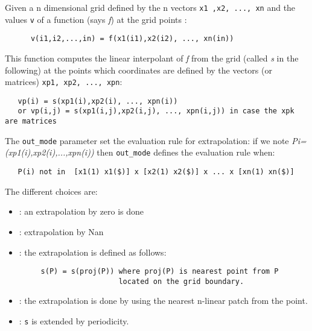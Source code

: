 \begin{mandescription}
  Given a n dimensional grid defined by the n vectors \verb!x1 ,x2, ..., xn! and the
  values \verb!v! of a function (says {\em f}) at the grid points :
\begin{verbatim}
      v(i1,i2,...,in) = f(x1(i1),x2(i2), ..., xn(in))
\end{verbatim}
  This function computes the linear interpolant of {\em f} from the grid (called {\em s}
  in the following) at the points which coordinates are defined by the vectors (or matrices) 
  \verb!xp1, xp2, ..., xpn!:
\begin{verbatim}
   vp(i) = s(xp1(i),xp2(i), ..., xpn(i))
   or vp(i,j) = s(xp1(i,j),xp2(i,j), ..., xpn(i,j)) in case the xpk are matrices
\end{verbatim}
    The \verb!out_mode! parameter set the evaluation rule for extrapolation: if we note 
    {\em Pi=(xp1(i),xp2(i),...,xpn(i))} then \verb!out_mode! defines the
    evaluation rule when:
\begin{verbatim}
   P(i) not in  [x1(1) x1($)] x [x2(1) x2($)] x ... x [xn(1) xn($)]
\end{verbatim}
    The different choices are:
  \begin{itemize}
  \item {} : an extrapolation by zero is done
  \item {} : extrapolation by Nan
  \item {} : the extrapolation is defined as follows:
\begin{verbatim}
     s(P) = s(proj(P)) where proj(P) is nearest point from P 
                       located on the grid boundary.
\end{verbatim}
\item {} : the extrapolation is done by using the nearest n-linear patch from the point.
\item {} : \verb!s! is extended by periodicity. 
  \end{itemize}
\end{mandescription}
